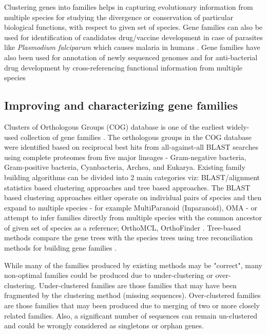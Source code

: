 \documentclass{article}
\begin{document}
		Clustering genes into families helps in capturing evolutionary information from multiple species for studying the divergence or conservation of particular biological functions, with respect to given set of species. Gene families can also be used for identification of candidates drug/vaccine development in case of parasites like \textit{Plasmodium falciparum} which causes malaria in humans \citep{gardner2002genome,kissinger2002plasmodium,whetzel2005plasmodb}. Gene families have also been used for annotation of newly sequenced genomes and for anti-bacterial drug development by cross-referencing functional information from multiple species \citep{tatusov1997genomic,galperin1999searching,natale2000towards,natale2000using,forterre2002hot}
		
		\subsection{Improving and characterizing gene families}
		Clusters of Orthologous Groups (COG) database is one of the earliest widely-used collection of gene families \citep{tatusov2000cog,tatusov2001cog}. The orthologous groups in the COG database were identified based on reciprocal best hits from all-against-all BLAST searches using complete proteomes from five major lineages - Gram-negative bacteria, Gram-positive bacteria, Cyanbacteria, Archea, and Eukarya. Existing family building algorithms can be divided into 2 main categories viz: BLAST/alignment statistics based clustering approaches and tree based approaches. The BLAST based clustering approaches either operate on individual pairs of species and then expand to multiple species - for example MultiParanoid (Inparanoid), OMA \citep{alexeyenko2006automatic,remm2001automatic,roth2008algorithm,altenhoff2010oma} - or attempt to infer families directly from multiple species with the common ancestor of given set of species as a reference;  OrthoMCL, OrthoFinder \citep{li2003orthomcl,emms2015orthofinder}. Tree-based methods compare the gene trees with the species trees using tree reconciliation methods for building gene families \citep{li2006treefam,van2007orthology,wapinski2007automatic,hubbard2006ensembl,dehal2006phylogenomic}.
		  
		 While many of the families produced by existing methods may be "correct", many non-optimal families could be produced due to under-clustering or over-clustering. Under-clustered families are those families that may have been fragmented by the clustering method (missing sequences). Over-clustered families are those families that may been produced due to merging of two or more closely related families. Also, a significant number of sequences can remain un-clustered and could be wrongly considered as singletons or orphan genes. 
		
\end{document}
